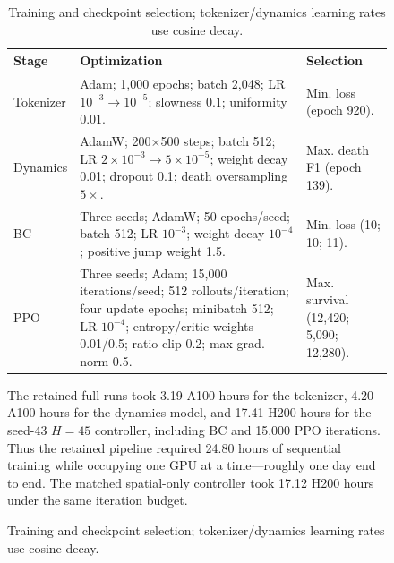 \begin{figure}[!htbp]
\begin{table}[!htbp]
  \centering
  \footnotesize
  \setlength{\tabcolsep}{4pt}
  \caption{Training and checkpoint selection; tokenizer/dynamics learning rates use cosine decay.}
  \label{tab:training}
  \begin{tabular}{>{\raggedright\arraybackslash}p{}>{\raggedright\arraybackslash}p{}>{\raggedright\arraybackslash}p{}}
    \toprule
    Stage & Optimization & Selection \\
    \midrule
    Tokenizer & Adam; 1,000 epochs; batch 2,048; LR \(10^{-3}\!\to\!10^{-5}\); slowness 0.1; uniformity 0.01. & Min. loss (epoch 920). \\
    Dynamics & AdamW; 200\(\times\)500 steps; batch 512; LR \(2\!\times\!10^{-3}\!\to\!5\!\times\!10^{-5}\); weight decay 0.01; dropout 0.1; death oversampling \(5\times\). & Max. death F1 (epoch 139). \\
    BC & Three seeds; AdamW; 50 epochs/seed; batch 512; LR \(10^{-3}\); weight decay \(10^{-4}\); positive jump weight 1.5. & Min. loss (10; 10; 11). \\
    PPO & Three seeds; Adam; 15,000 iterations/seed; 512 rollouts/iteration; four update epochs; minibatch 512; LR \(10^{-4}\); entropy/critic weights 0.01/0.5; ratio clip 0.2; max grad. norm 0.5. & Max. survival (12,420; 5,090; 12,280). \\
    \bottomrule
  \end{tabular}
\end{table}

The retained full runs took 3.19 A100 hours for the tokenizer, 4.20 A100 hours for the dynamics model, and 17.41 H200 hours for the seed-43 \(H=45\) controller, including BC and 15,000 PPO iterations.
Thus the retained pipeline required 24.80 hours of sequential training while occupying one GPU at a time---roughly one day end to end.
The matched spatial-only controller took 17.12 H200 hours under the same iteration budget.


\end{figure}
